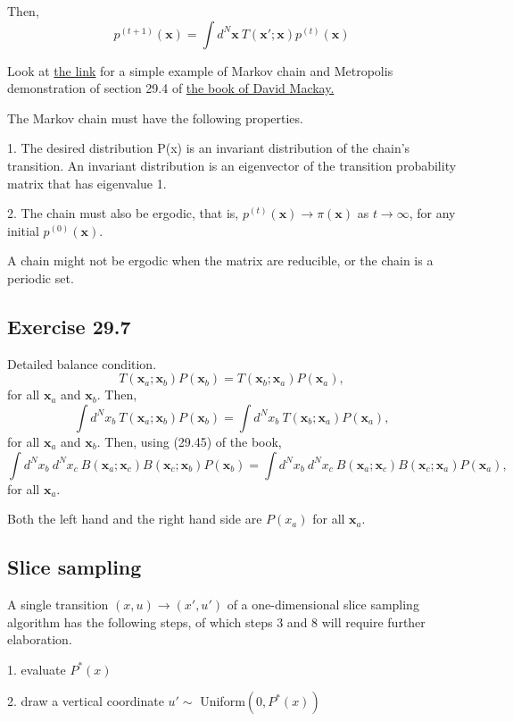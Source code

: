 \documentclass[a4paper,11pt]{article}
\newcommand{\vect}[1]{\boldsymbol{\mathbf{#1}}}
\numberwithin{equation}{section}
\begin{document}
{Then, 
$$
p^{(t+1)}(\vect x) = \int d^N \vect x ~T(\vect x' ; \vect x)p^{(t)}(\vect x)
$$

Look at \href{https://github.com/physhik/Study-of-David-Mackay-s-book-/blob/master/reproduceFigure29.14.pdf/}{the link} for a simple example of Markov chain and Metropolis demonstration of section 29.4 of \href{http://www.inference.phy.cam.ac.uk/mackay/itila/}{the book of David Mackay.}

The Markov chain must have the following properties. 

1. The desired distribution P(x) is an invariant distribution of the chain's transition. An invariant distribution is an eigenvector of the transition probability matrix that has eigenvalue 1.

2. The chain must also be ergodic, that is, $p^{(t)}(\vect x) \rightarrow \pi(\vect x)$ as $t \rightarrow \infty$, for any initial $p^{(0)}(\vect x)$. 

A chain might not be ergodic when the matrix are reducible, or the chain is a periodic set. 

\subsection{Exercise 29.7}
Detailed balance condition. 
$$
T(\vect x_a ; \vect x_b)P(\vect x_b) = T(\vect x_b ; \vect x_a)P(\vect x_a),
$$
for all $\vect x_a$ and $\vect x_b$. 
Then, 
$$
\int d^N x_b~T(\vect x_a ; \vect x_b)P(\vect x_b) = \int d^N x_b~T(\vect x_b ; \vect x_a)P(\vect x_a),
$$
for all $\vect x_a$ and $\vect x_b$.
Then, using (29.45) of the book,
$$
\int d^N x_b ~d^N x_c~B(\vect x_a ; \vect x_c)B(\vect x_c ; \vect x_b)P(\vect x_b) =\int d^N x_b ~d^N x_c~B(\vect x_a ; \vect x_c)B(\vect x_c ; \vect x_a)P(\vect x_a),
$$
for all $\vect x_a$.

Both the left hand and the right hand side are $P(x_a)$ for all $\vect x_a$.

\subsection{Slice sampling}

A single transition $(x,u) \rightarrow (x',u')$ of a one-dimensional slice sampling
algorithm has the following steps, of which steps 3 and 8 will require further
elaboration.

1. evaluate $P^*(x)$

2. draw a vertical coordinate $u' \sim$ Uniform$(0,P^*(x))$

}
\end{document}
